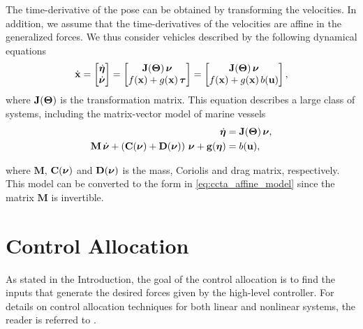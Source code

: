 The time-derivative of the pose can be obtained by transforming the velocities. %
In addition, we assume that the time-derivatives of the velocities are affine in the generalized forces.
We thus consider vehicles described by the following dynamical equations
\begin{equation}
    \dot{\mathbf{x}} = \begin{bmatrix} \dot{\bm{\eta}} \\ \dot{\bm{\nu}} \end{bmatrix} = \begin{bmatrix}
        \mathbf{J}(\bm{\Theta})\,\bm{\nu} \\ f(\mathbf{x}) + g(\mathbf{x})\,\bm{\tau}
    \end{bmatrix} = \begin{bmatrix}
        \mathbf{J}(\bm{\Theta})\,\bm{\nu} \\ f(\mathbf{x}) + g(\mathbf{x})\,b(\mathbf{u})
    \end{bmatrix},
    \label{eq:ccta_affine_model}
\end{equation}
where $\mathbf{J}(\bm{\Theta})$ is the transformation matrix. %
This equation describes a large class of systems, including the matrix-vector model of marine vessels \cite{fossen_handbook_2011}
\begin{subequations}
    \begin{align}
        \dot{\bs{\eta}} &= \mathbf{J}(\bs{\Theta})\,\bs{\nu}, \\
        \mathbf{M}\,\dot{\bs{\nu}} + \left(\mathbf{C}(\bs{\nu}) + \mathbf{D}(\bs{\nu})\right)\,\bs{\nu} + \mathbf{g}(\bs{\eta}) &= b(\mathbf{u}),%
    \end{align}
    \label{eq:ccta_matrix_model}
    \vspace{-4mm}
\end{subequations}

\noindent where $\mathbf{M}$, $\mathbf{C}(\bm{\nu})$ and $\mathbf{D}(\bm{\nu})$ is the mass, Coriolis and drag matrix, respectively. %
This model can be converted to the form in \eqref{eq:ccta_affine_model} since the matrix $\mathbf{M}$ is invertible.

\section{Control Allocation}
\label{sec:ccta_alloc}

As stated in the Introduction, the goal of the control allocation is to find the inputs that generate the desired forces given by the high-level controller.
For details on control allocation techniques for both linear and nonlinear systems, the reader is referred to \cite{johansen_control_2013}.

